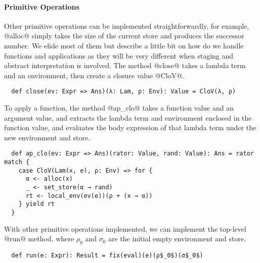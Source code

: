 \paragraph{Primitive Operations}
Other primitive operations can be implemented straightforwardly, for example,
@alloc@ simply takes the size of the current store and produces the successor number.
We elide most of them but describe a little bit on how do we handle functions
and applications as they will be very different when staging and abstract
interpretation is involved. The method @close@ takes a lambda term and an
environment, then create a closure value @CloV@.

\begin{lstlisting}
  def close(ev: Expr => Ans)(λ: Lam, ρ: Env): Value = CloV(λ, ρ)
\end{lstlisting}

To apply a function, the method @ap_clo@ takes a function value and an argument
value, and extracts the lambda term and environment enclosed in the function value,
and evaluates the body expression of that lambda term under the new environment and store.

\begin{lstlisting}
  def ap_clo(ev: Expr => Ans)(rator: Value, rand: Value): Ans = rator match {
    case CloV(Lam(x, e), ρ: Env) => for {
      α <- alloc(x)
      _ <- set_store(α → rand)
      rt <- local_env(ev(e))(ρ + (x → α))
    } yield rt
  }
\end{lstlisting}

With other primitive operations implemented, we can implement the top-level
@run@ method, where $\rho_0$ and $\sigma_0$ are the initial empty environment and
store.

\begin{lstlisting}
  def run(e: Expr): Result = fix(eval)(e)(ρ$_0$)(σ$_0$)
\end{lstlisting}
